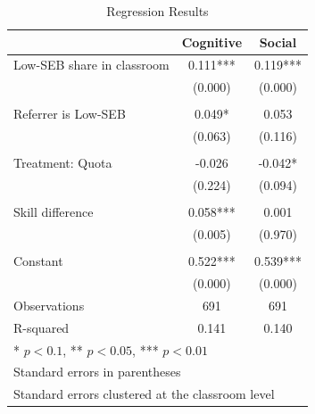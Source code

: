 \documentclass[11pt,a4paper,oneside]{article}
\begin{document}
\begin{table}
\centering
\caption{Regression Results}
\begin{tabular}{@{}lcc@{}}
\toprule
 & Cognitive & Social \\
\midrule
Low-SEB share in classroom & 0.111*** & 0.119*** \\
 & (0.000) & (0.000) \\
 \\
Referrer is Low-SEB & 0.049* & 0.053 \\
 & (0.063) & (0.116) \\
 \\
Treatment: Quota & -0.026 & -0.042* \\
 & (0.224) & (0.094) \\
 \\
Skill difference & 0.058*** & 0.001 \\
 & (0.005) & (0.970) \\
 \\
Constant & 0.522*** & 0.539*** \\
 & (0.000) & (0.000) \\
\midrule
Observations & 691 & 691 \\
R-squared & 0.141 & 0.140 \\
\midrule
\multicolumn{3}{l}{* $p<0.1$, ** $p<0.05$, *** $p<0.01$} \\
\multicolumn{3}{l}{Standard errors in parentheses} \\
\multicolumn{3}{l}{Standard errors clustered at the classroom level} \\
\end{tabular}
\label{tab:regression-results-cognitive}
\end{table}
\end{document}
